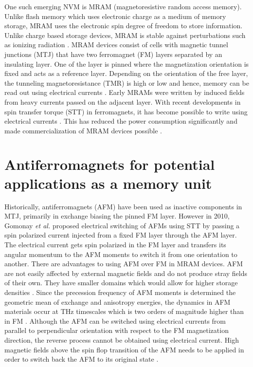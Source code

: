\documentclass[11pt,edeposit,draftthesis]{uiucthesis2020}
\begin{document}
\begin{mainmatter}
One such emerging NVM is MRAM (magnetoresistive random access memory). Unlike flash memory which uses electronic charge as a medium of memory storage, MRAM uses the electronic spin degree of freedom to store information. Unlike charge based storage devices, MRAM is stable against perturbations such as ionizing radiation \cite{Wadley2016}. MRAM devices consist of cells with magnetic tunnel junctions (MTJ) that have two ferromagnet (FM) layers separated by an insulating layer. One of the layer is pinned where the magnetization orientation is fixed and acts as a reference layer. Depending on the orientation of the free layer, the tunneling magnetoresistance (TMR) is high or low and hence, memory can be read out using electrical currents \cite{Krishnan2016}. Early MRAMs were written by induced fields from heavy currents passed on the adjacent layer. With recent developments in spin transfer torque (STT) in ferromagnets, it has become possible to write using electrical currents \cite{Chappert2007}. This has reduced the power consumption significantly and made commercialization of MRAM devices possible \cite{Krishnan2016,Bhatti2017}.

\section{Antiferromagnets for potential applications as a memory unit}

Historically, antiferromagnets (AFM) have been used as inactive components in MTJ, primarily in exchange biasing the pinned FM layer. However in 2010, Gomonay \emph{et al.} \cite{Gomonay2010} proposed electrical switching of AFMs using STT by passing a spin polarized current injected from a fixed FM layer through the AFM layer. The electrical current gets spin polarized in the FM layer and transfers its angular momentum to the AFM moments to switch it from one orientation to another. There are advantages to using AFM over FM in MRAM devices. AFM are not easily affected by external magnetic fields and do not produce stray fields of their own. They have smaller domains which would allow for higher storage densities \cite{Wadley2016}. Since the precession frequency of AFM moments is determined the geometric mean of exchange and anisotropy energies, the dynamics in AFM materials occur at THz timescales which is two orders of magnitude higher than in FM \cite{Siddiqui2020}. Although the AFM can be switched using electrical currents from parallel to perpendicular orientation with respect to the FM magnetization direction, the reverse process cannot be obtained using electrical current. High magnetic fields above the spin flop transition of the AFM needs to be applied in order to switch back the AFM to its original state \cite{Gomonay2010}.


\end{mainmatter}
\end{document}

